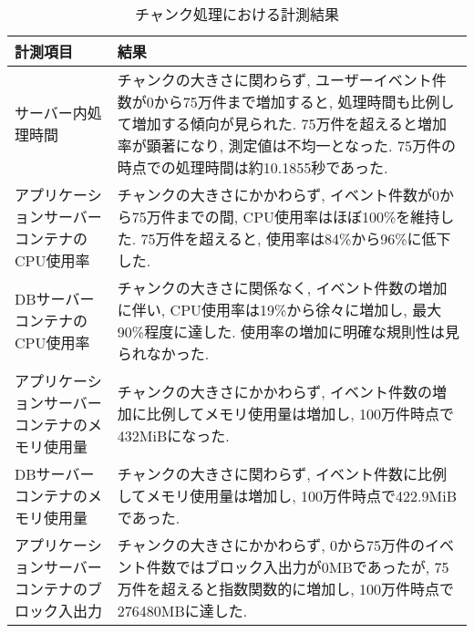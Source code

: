 \documentclass[../../../main]{subfiles}
\begin{document}
    \begin{table}[H]
        \centering
        \caption{チャンク処理における計測結果}
        \label{tab:result-chunk}
        \begin{tabular}{|p{4cm}|p{10cm}|}
            \hline
            \textbf{計測項目}                & \textbf{結果}                                                                                                                                                                \\ \hline
            サーバー内処理時間                    & チャンクの大きさに関わらず, ユーザーイベント件数が0から75万件まで増加すると, 処理時間も比例して増加する傾向が見られた. 75万件を超えると増加率が顕著になり, 測定値は不均一となった. 75万件の時点での処理時間は約10.1855秒であった.                                                     \\ \hline
            アプリケーションサーバーコンテナのCPU使用率      & チャンクの大きさにかかわらず, イベント件数が0から75万件までの間, CPU使用率はほぼ100\%を維持した. 75万件を超えると, 使用率は84\%から96\%に低下した.                                                                                         \\ \hline
            DBサーバーコンテナのCPU使用率            & チャンクの大きさに関係なく, イベント件数の増加に伴い, CPU使用率は19\%から徐々に増加し, 最大90\%程度に達した. 使用率の増加に明確な規則性は見られなかった.                                                                                           \\ \hline
            アプリケーションサーバーコンテナのメモリ使用量      & チャンクの大きさにかかわらず, イベント件数の増加に比例してメモリ使用量は増加し, 100万件時点で432MiBになった.                                                                                                                  \\ \hline
            DBサーバーコンテナのメモリ使用量            & チャンクの大きさに関わらず, イベント件数に比例してメモリ使用量は増加し, 100万件時点で422.9MiBであった.                                                                                                                    \\ \hline
            アプリケーションサーバーコンテナのブロック入出力     & チャンクの大きさにかかわらず, 0から75万件のイベント件数ではブロック入出力が0MBであったが, 75万件を超えると指数関数的に増加し, 100万件時点で276480MBに達した.                                                                                     \\ \hline

\end{tabular}
\end{table}
\end{document}

